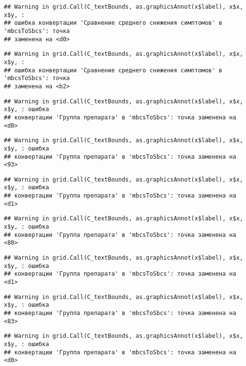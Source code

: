 \documentclass[
]{article}
\begin{document}
\begin{verbatim}
## Warning in grid.Call(C_textBounds, as.graphicsAnnot(x$label), x$x, x$y, :
## ошибка конвертации 'Сравнение среднего снижения симптомов' в 'mbcsToSbcs': точка
## заменена на <d0>
\end{verbatim}

\begin{verbatim}
## Warning in grid.Call(C_textBounds, as.graphicsAnnot(x$label), x$x, x$y, :
## ошибка конвертации 'Сравнение среднего снижения симптомов' в 'mbcsToSbcs': точка
## заменена на <b2>
\end{verbatim}

\begin{verbatim}
## Warning in grid.Call(C_textBounds, as.graphicsAnnot(x$label), x$x, x$y, : ошибка
## конвертации 'Группа препарата' в 'mbcsToSbcs': точка заменена на <d0>
\end{verbatim}

\begin{verbatim}
## Warning in grid.Call(C_textBounds, as.graphicsAnnot(x$label), x$x, x$y, : ошибка
## конвертации 'Группа препарата' в 'mbcsToSbcs': точка заменена на <93>
\end{verbatim}

\begin{verbatim}
## Warning in grid.Call(C_textBounds, as.graphicsAnnot(x$label), x$x, x$y, : ошибка
## конвертации 'Группа препарата' в 'mbcsToSbcs': точка заменена на <d1>
\end{verbatim}

\begin{verbatim}
## Warning in grid.Call(C_textBounds, as.graphicsAnnot(x$label), x$x, x$y, : ошибка
## конвертации 'Группа препарата' в 'mbcsToSbcs': точка заменена на <80>
\end{verbatim}

\begin{verbatim}
## Warning in grid.Call(C_textBounds, as.graphicsAnnot(x$label), x$x, x$y, : ошибка
## конвертации 'Группа препарата' в 'mbcsToSbcs': точка заменена на <d1>
\end{verbatim}

\begin{verbatim}
## Warning in grid.Call(C_textBounds, as.graphicsAnnot(x$label), x$x, x$y, : ошибка
## конвертации 'Группа препарата' в 'mbcsToSbcs': точка заменена на <83>
\end{verbatim}

\begin{verbatim}
## Warning in grid.Call(C_textBounds, as.graphicsAnnot(x$label), x$x, x$y, : ошибка
## конвертации 'Группа препарата' в 'mbcsToSbcs': точка заменена на <d0>
\end{verbatim}
\end{document}
